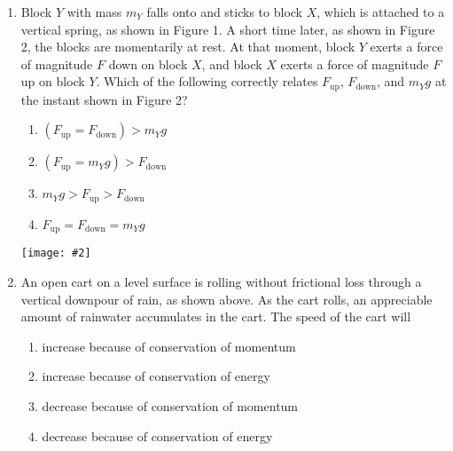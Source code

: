 \documentclass[11pt]{article}
\newcommand{\pic}[2]{\texttt{[image: \#2]}}
\begin{document}
\begin{multicols}{2}
\begin{enumerate}[leftmargin=18pt]
    \begin{center}
      \pic{.25}{falling-blocks}
    \end{center}
  \item Block $Y$ with mass $m_Y$ falls onto and sticks to block $X$, which is
    attached to a vertical spring, as shown in Figure 1. A short time later, as
    shown in Figure 2, the blocks are momentarily at rest. At that moment,
    block $Y$ exerts a force of magnitude $F$ down on block $X$, and block $X$
    exerts a force of magnitude $F$ up on block $Y$. Which of the following
    correctly relates $F_\text{up}$, $F_\text{down}$, and $m_Yg$ at the
    instant shown in Figure 2?
    \begin{enumerate}[nosep,leftmargin=18pt,label=(\Alph*)]
    \item$\left(F_\mathrm{up}=F_\mathrm{down}\right)>m_Yg$
    \item$\left(F_\mathrm{up}=m_Yg\right)>F_\mathrm{down}$
    \item$m_Yg > F_\mathrm{up} > F_\mathrm{down}$
    \item$F_\mathrm{up}=F_\mathrm{down}=m_Yg$
    \end{enumerate}
    \vspace{.7in}
    
    \begin{center}
      \pic{.35}{downpour}
    \end{center}
  \item An open cart on a level surface is rolling without frictional loss
    through a vertical downpour of rain, as shown above. As the cart rolls,
    an appreciable amount of rainwater accumulates in the cart. The speed of
    the cart will
    \begin{enumerate}[nosep,leftmargin=18pt,label=(\Alph*)]
    \item increase because of conservation of momentum
    \item increase because of conservation of energy
    \item decrease because of conservation of momentum
    \item decrease because of conservation of energy
    \end{enumerate}
    \vspace{.7in}
    

\end{enumerate}
\end{multicols}
\end{document}
